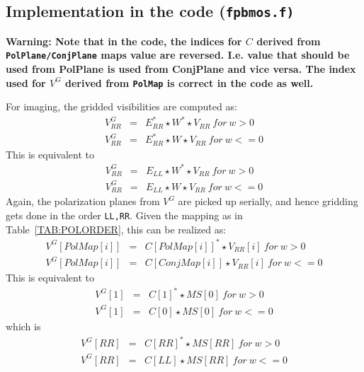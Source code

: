 \documentclass[11pt,epsf]{article}
\begin{document}
\subsection{Implementation in the code (\tt fpbmos.f)}
{\bf Warning: Note that in the code, the indices for $C$ derived from
  {\tt PolPlane/ConjPlane} maps value are reversed.  I.e. value that
  should be used from PolPlane is used from ConjPlane and vice
  versa.  The index used for $V^G$ derived from {\tt PolMap} is
  correct in the code as well.}

For imaging, the gridded visibilities are computed as:
\begin{eqnarray}
 V^G_{RR} &=& E_{RR}^* \star W^* \star V_{RR}~for~w>0 \nonumber \\
 V^G_{RR} &=& E_{RR}^* \star W \star V_{RR}~for~w<=0
\end{eqnarray}
This is equivalent to
\begin{eqnarray}
 V^G_{RR} &=& E_{LL} \star W^* \star V_{RR}~for~w>0 \nonumber \\
 V^G_{RR} &=& E_{LL} \star W \star V_{RR}~for~w<=0
\end{eqnarray}
Again, the polarization planes from $V^G$ are picked up serially, and
hence gridding gets done in the order {\tt LL,RR}.
Given the mapping as in Table~\ref{TAB:POLORDER}, this can be realized
as:
\begin{eqnarray}
 V^G[PolMap[i]] &=& C[PolMap[i]]^* \star V_{RR}[i]~for~w>0  \nonumber \\
 V^G[PolMap[i]] &=& C[ConjMap[i]] \star V_{RR}[i]~for~w<=0
\end{eqnarray}
This is equivalent to
\begin{eqnarray}
 V^G[1]&=&C[1]^* \star MS[0]~for~w>0\nonumber\\
 V^G[1]&=&C[0] \star MS[0]~for~w<=0
\end{eqnarray}
which is 
\begin{eqnarray}
 V^G[RR]&=&C[RR]^* \star MS[RR]~for~w>0\nonumber\\
 V^G[RR]&=&C[LL] \star MS[RR]~for~w<=0
\end{eqnarray}
\end{document}
